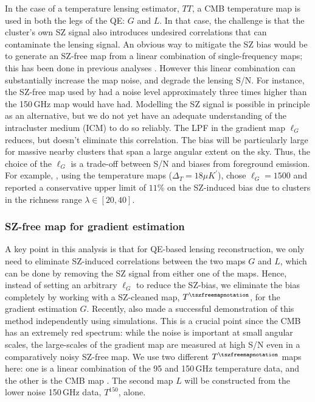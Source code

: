 \documentclass[usenatbib, twocolumn, nofootinbib, reprint]{aastex61}
\newcommand{\ukam}{$\mu K^{\prime}$}
\begin{document}
In the case of a temperature lensing estimator, $TT$, a CMB temperature map is used in both the legs of the QE: $G$ and $L$.
In that case, the challenge is that the cluster's own SZ signal also introduces undesired correlations that can contaminate the lensing signal. 
An obvious way to mitigate the SZ bias would be to generate an SZ-free map from a linear combination of single-frequency maps; this has been done in previous analyses \citep{baxter15}. 
However this linear combination can substantially increase the map noise, and degrade the lensing S/N. 
For instance, the SZ-free map used by \citet{baxter15} had a noise level approximately three times higher than the 150\,GHz map would have had. 
Modelling the SZ signal is possible in principle as an alternative,  but we do not yet have an adequate understanding of the intracluster medium (ICM) to do so reliably. 
The LPF in the gradient map $\ell_{G}$ reduces, but doesn't eliminate this correlation. 
The bias will be particularly large for massive nearby clusters that span a large angular extent on the sky.
Thus, the choice of the $\ell_G$ is a trade-off between S/N and biases from foreground emission. 
For example, 
, using the \sptsz{} temperature maps ($\Delta_{T} = 18$\ukam{}), 
chose $\ell_{G} = 1500$ and
reported a conservative upper limit of $11\%$ on the SZ-induced bias due to clusters in the richness range $\lambda \in [20,40]$.

\subsubsection{SZ-free map for gradient estimation}
\label{subsec_QE_modificaltion}
A key point in this analysis is that for 
QE-based lensing reconstruction, we only need to eliminate SZ-induced correlations between the two maps $G$ and $L$, which can be done by removing the SZ signal from either one of the maps.
Hence, instead of setting an arbitrary $\ell_{G}$ to reduce the SZ-bias, we eliminate the bias completely by working with a SZ-cleaned map, $T^{\tszfreemapnotation}$, for the gradient estimation $G$.
Recently, \citet{madhavacheril18} also made a successful demonstration of this method independently using simulations.
This is a crucial point since the CMB has an extremely red spectrum: while the noise is important at small angular scales, the large-scales of the gradient map are measured at high S/N even in a comparatively noisy SZ-free map. 
We use two different $T^{\tszfreemapnotation}$ maps here: one is a linear combination of the \sptpol{} 95 and 150\,GHz temperature data, and the other is the \planck{} \lgmca{} CMB map \citep{bobin16}.
The second map $L$ will be constructed from the lower noise \sptpol{} 150\,GHz data, $T^{150}$, alone. 
\end{document}
